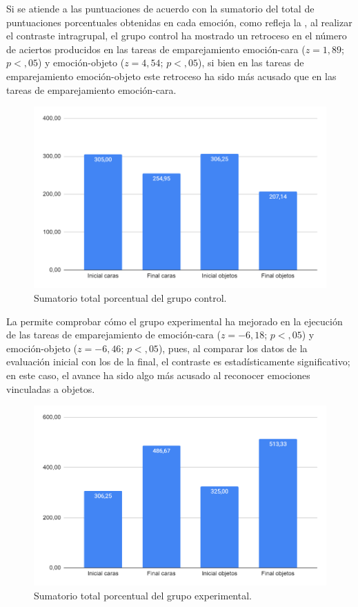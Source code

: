 \documentclass[spanish]{textolivre}
\begin{document}
Si se atiende a las puntuaciones de acuerdo con la sumatorio del total de puntuaciones porcentuales obtenidas en cada emoción, como refleja la , al realizar el contraste intragrupal, el grupo control ha mostrado un retroceso en el número de aciertos producidos en las tareas de emparejamiento emoción-cara ($z = 1,89$; $p < ,05$) y emoción-objeto ($z = 4,54$; $p < ,05$), si bien en las tareas de emparejamiento emoción-objeto este retroceso ha sido más acusado que en las tareas de emparejamiento emoción-cara.

\begin{figure}[h!]
    \centering
    \includegraphics[width=0.85\linewidth]{Fig3.png}
    \caption{Sumatorio total porcentual del grupo control.}
    \label{fig3}
\end{figure}

La  permite comprobar cómo el grupo experimental ha mejorado en la ejecución de las tareas de emparejamiento de emoción-cara ($z = -6,18$; $p < ,05$) y emoción-objeto ($z = -6,46$; $p < ,05$), pues, al comparar los datos de la evaluación inicial con los de la final, el contraste es estadísticamente significativo; en este caso, el avance ha sido algo más acusado al reconocer emociones vinculadas a objetos.

\begin{figure}[h!]
    \centering
    \includegraphics[width=0.85\linewidth]{Fig4.png}
    \caption{Sumatorio total porcentual del grupo experimental.}
    \label{fig4}
\end{figure}
\end{document}
